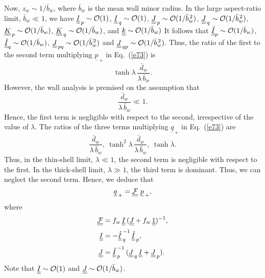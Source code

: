 \documentclass[12pt,prb,aps,notitlepage]{revtex4-1}
\begin{document}
Now, $z_w\sim 1/\bar{b}_w$, where $\bar{b}_w$ is the mean wall minor radius. 
In the large aspect-ratio limit, $\bar{b}_w\ll 1$, we have $\underline{\underline{I}}_{\,p}\sim{\cal O}(1)$, $\underline{\underline{I}}_{\,q}\sim{\cal O}(1)$, 
$\underline{\underline{J}}_{\,p}\sim{\cal O}(1/\bar{b}_w^{\,2})$, $\underline{\underline{J}}_{\,q}\sim{\cal O}(1/\bar{b}_w^{\,2})$, 
$\underline{\underline{K}}_{\,p}\sim{\cal O}(1/\bar{b}_w)$, $\underline{\underline{K}}_{\,q}\sim{\cal O}(1/\bar{b}_w)$,
and $\underline{\underline{k}}\sim{ \cal O}(1/\bar{b}_w)$  It follows that
$\underline{\underline{\hat I}}_p\sim{\cal O}(1/\bar{b}_w)$, $\underline{\underline{\hat I}}_q\sim{\cal O}(1/\bar{b}_w)$, $\underline{\underline{J}}_{\,pq} \sim{\cal O}(1/\bar{b}_w^{\,2})$ and $\underline{\underline{J}}_{\,qp} \sim{\cal O}(1/\bar{b}_w^{\,2})$. 
Thus, the ratio of the first to the second term multiplying $\underline{p}_{\,+}$ in Eq.~(\ref{e73}) is 
\begin{equation}
\tanh\lambda \,\frac{\bar{d}_w}{\lambda\,\bar{b}_w}.
\end{equation}
However, the wall analysis is premised on the assumption that
\begin{equation}
\frac{\bar{d}_w}{\lambda\,\bar{b}_w}\ll 1.
\end{equation}
Hence, the first term is negligible with respect to the second, irrespective of the value of $\lambda$. The
ratios of the three terms multiplying $\underline{q}_{\,+}$ in Eq.~(\ref{e73}) are
\begin{equation}
\frac{\bar{d}_w}{\lambda\,\bar{b}_w},~ \tanh^2\lambda\,\frac{\bar{d}_w}{\lambda\,\bar{b}_w},~ \tanh\lambda.
\end{equation}
Thus, in the thin-shell limit, $\lambda\ll 1$, the second term is negligible with respect to the first. In the thick-shell limit, $\lambda\gg 1$, the third term is
dominant. Thus, we can neglect the second term. Hence, we deduce that
\begin{equation}\label{e88}
\underline{q}_{\,+} = \underline{\underline{\cal F}}\,\,\underline{p}_{\,+},
\end{equation}
where
\begin{align}
\underline{\underline{\cal F}}&= 
f_w\,\underline{\underline{I}}\,(\underline{\underline{J}}+ f_w\,\underline{\underline{1}})^{-1},\\[0.5ex]
\underline{\underline{I}}&=  -\underline{\underline{\hat{I}}}_{\,q}^{\,-1}\,\underline{\underline{\hat{I}}}_{\,p},\\[0.5ex]
\underline{\underline{J}}&= \underline{\underline{\hat{I}}}_{\,p}^{\,-1}\,(\underline{\underline{J}}_{\,q}\,\underline{\underline{I}} + \underline{\underline{J}}_{\,p}).
\end{align}
Note that $\underline{\underline{I}}\sim {\cal O}(1)$  and $\underline{\underline{J}}\sim {\cal O}(1/\bar{b}_w)$. 
\end{document}
